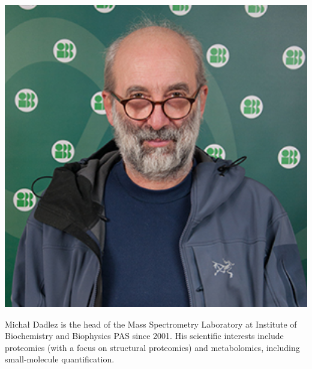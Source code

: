 \documentclass[]{MathAppl18}
\begin{document}
\begin{minipage}{0.2\textwidth}
        \includegraphics[width=1\textwidth]{Figures/dadlez.jpg}
\end{minipage}
\hspace{0.01\textwidth}
\begin{minipage}{0.7\textwidth}
    Michał Dadlez is the head of the Mass Spectrometry Laboratory at Institute of Biochemistry and Biophysics PAS since 2001. His scientific interests include proteomics (with a focus on structural proteomics) and metabolomics, including small-molecule quantification.
\end{minipage}
\end{document}
